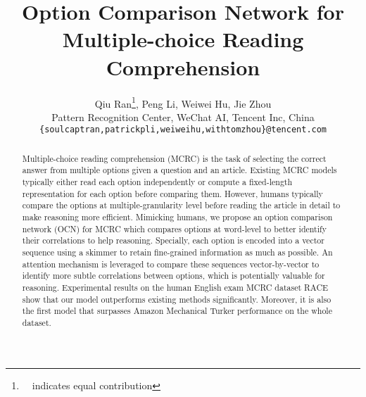 \documentclass[11pt,a4paper]{article}
\title{Option Comparison Network for Multiple-choice Reading Comprehension}
\author{Qiu Ran\thanks{\ \ indicates equal contribution}, Peng Li\footnotemark[1], Weiwei Hu, Jie Zhou \\
  Pattern Recognition Center, WeChat AI, Tencent Inc, China \\
  \texttt{\{soulcaptran,patrickpli,weiweihu,withtomzhou\}@tencent.com}}
\date{}
\begin{document}
\maketitle
\begin{abstract}
Multiple-choice reading comprehension (MCRC) is the task of selecting the correct answer from multiple options given a question and an article. Existing MCRC models typically either read each option independently or compute a fixed-length representation for each option before comparing them. However, humans typically compare the options at multiple-granularity level before reading the article in detail to make reasoning more efficient. Mimicking humans, we propose an option comparison network (OCN) for MCRC which compares options at word-level to better identify their correlations to help reasoning. Specially, each option is encoded into a vector sequence using a skimmer to retain fine-grained information as much as possible. An attention mechanism is leveraged to compare these sequences vector-by-vector to identify more subtle correlations between options, which is potentially valuable for reasoning. Experimental results on the human English exam MCRC dataset RACE show that our model outperforms existing methods significantly. Moreover, it is also the first model that surpasses Amazon Mechanical Turker performance on the whole dataset.
\end{abstract}
\end{document}
